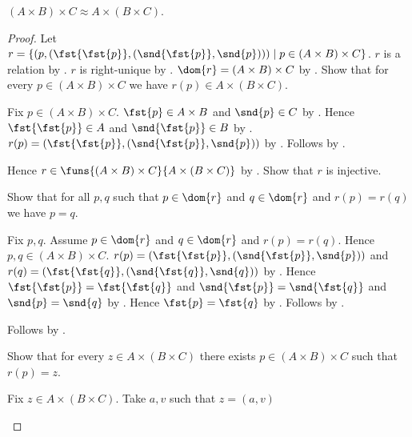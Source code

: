 \begin{proposition}\label{times_equinum_associative}
    $(A\times B)\times C\approx A\times(B\times C)$.
\end{proposition}
\begin{proof}
    Let $r=\{(p,(\fst{\fst{p}},(\snd{\fst{p}},\snd{p})))\mid
        p\in(A\times B)\times C\}$.
    $r$ is a relation by .
    $r$ is right-unique by .
    $\dom{r}=(A\times B)\times C$
        by .
    Show that for every $p\in(A\times B)\times C$ we have
        $r(p)\in A\times(B\times C)$.
    \begin{subproof}
        Fix $p\in(A\times B)\times C$.
        $\fst{p}\in A\times B$ and $\snd{p}\in C$
            by .
        Hence $\fst{\fst{p}}\in A$ and $\snd{\fst{p}}\in B$
            by .
        $r(p)=(\fst{\fst{p}},(\snd{\fst{p}},\snd{p}))$
            by .
        Follows by .
    \end{subproof}
    Hence $r\in\funs{(A\times B)\times C}{A\times(B\times C)}$
        by .
    Show that $r$ is injective.
    \begin{subproof}
        Show that for all $p,q$ such that $p\in\dom{r}$ and
            $q\in\dom{r}$ and $r(p)=r(q)$ we have $p=q$.
        \begin{subproof}
            Fix $p,q$.
            Assume $p\in\dom{r}$ and $q\in\dom{r}$ and $r(p)=r(q)$.
            Hence $p,q\in(A\times B)\times C$.
            $r(p)=(\fst{\fst{p}},(\snd{\fst{p}},\snd{p}))$ and
                $r(q)=(\fst{\fst{q}},(\snd{\fst{q}},\snd{q}))$
                by .
            Hence $\fst{\fst{p}}=\fst{\fst{q}}$ and
                $\snd{\fst{p}}=\snd{\fst{q}}$ and
                $\snd{p}=\snd{q}$ by .
            Hence $\fst{p}=\fst{q}$
                by
                .
            Follows by
                .
        \end{subproof}
        Follows by .
    \end{subproof}
    Show that for every $z\in A\times(B\times C)$ there exists
        $p\in(A\times B)\times C$ such that $r(p)=z$.
    \begin{subproof}
        Fix $z\in A\times(B\times C)$.
        Take $a,v$ such that $z=(a,v)$

\end{subproof}
\end{proof}
